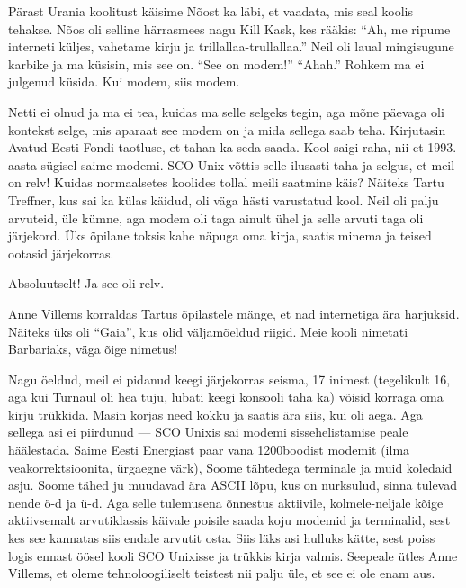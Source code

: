 Pärast Urania koolitust käisime Nõost 
ka läbi, et vaadata, mis seal koolis tehakse. Nõos oli 
selline härrasmees nagu Kill Kask, kes rääkis: \enquote{Ah, me ripume interneti küljes, vahetame kirju ja 
trillallaa-trullallaa.} Neil oli laual mingisugune karbike ja ma küsisin, mis see on. 
\enquote{See on modem!} \enquote{Ahah.} Rohkem ma ei julgenud küsida. Kui 
modem, siis modem. 

Netti ei olnud ja ma ei tea, kuidas ma selle 
selgeks tegin, aga mõne päevaga oli kontekst selge, mis aparaat see modem on 
ja mida sellega saab teha. Kirjutasin Avatud Eesti Fondi 
taotluse, et tahan ka seda saada. Kool 
saigi raha, nii et 1993. aasta sügisel saime modemi. 
SCO Unix võttis selle ilusasti taha ja selgus, et meil 
on relv! Kuidas normaalsetes koolides tollal meili saatmine käis?
Näiteks Tartu Treffner, kus sai ka külas 
käidud, oli väga hästi varustatud kool. Neil oli palju arvuteid, üle kümne, aga modem 
oli taga ainult ühel ja selle arvuti taga oli järjekord. Üks õpilane toksis
kahe näpuga oma kirja, saatis minema ja teised ootasid järjekorras.


Absoluutselt! Ja see oli relv. 

Anne Villems korraldas Tartus
õpilastele mänge, et nad internetiga ära harjuksid. Näiteks üks oli \enquote{Gaia}, kus olid väljamõeldud riigid. Meie kooli nimetati Barbariaks, 
väga õige nimetus!

Nagu öeldud, meil ei pidanud keegi järjekorras seisma, 17 inimest (tegelikult 16, aga 
kui Turnaul oli hea tuju, lubati keegi konsooli taha 
ka) võisid korraga oma kirju trükkida. Masin korjas need kokku ja saatis ära
siis, kui oli aega. Aga sellega asi ei piirdunud --- SCO 
Unixis sai modemi sissehelistamise peale häälestada. Saime Eesti Energiast paar vana 1200boodist modemit (ilma veakorrektsioonita, 
ürgaegne värk), Soome tähtedega terminale ja muid
koledaid asju. Soome tähed ju muudavad ära ASCII lõpu, kus on nurksulud, sinna 
tulevad nende ö-d ja ü-d. Aga selle tulemusena õnnestus aktiivile, 
kolmele-neljale kõige aktiivsemalt arvutiklassis käivale poisile saada koju 
modemid ja terminalid, sest kes see kannatas siis endale arvutit osta. Siis
läks asi hulluks kätte, sest poiss logis ennast öösel kooli SCO 
Unixisse ja trükkis kirja valmis. Seepeale ütles Anne Villems, et oleme tehnoloogiliselt teistest nii palju üle, et 
see ei ole enam aus. 

